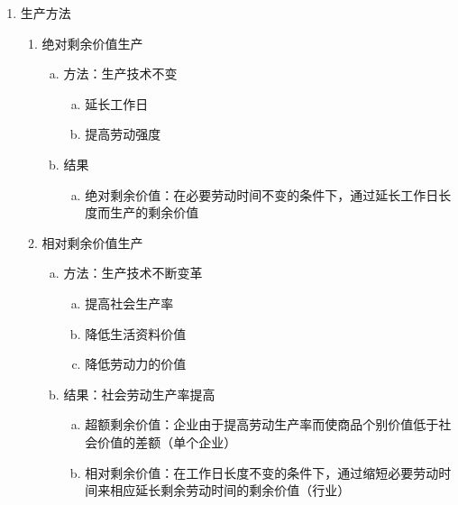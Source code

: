\documentclass[12pt]{book}
\begin{document}
\begin{enumerate}[1.]
    \item 生产方法
          \begin{enumerate}[(1)]
              \item 绝对剩余价值生产
                    \begin{enumerate}[a.]
                        \item 方法：生产技术不变
                              \begin{enumerate}[(a)]
                                  \item 延长工作日
                                  \item 提高劳动强度
                              \end{enumerate}
                        \item 结果
                              \begin{enumerate}[(a)]
                                  \item 绝对剩余价值：在必要劳动时间不变的条件下，通过延长工作日长度而生产的剩余价值
                              \end{enumerate}
                    \end{enumerate}
              \item 相对剩余价值生产
                    \begin{enumerate}[a.]
                        \item 方法：生产技术不断变革
                              \begin{enumerate}[(a)]
                                  \item 提高社会生产率
                                  \item 降低生活资料价值
                                  \item 降低劳动力的价值
                              \end{enumerate}
                        \item 结果：社会劳动生产率提高
                              \begin{enumerate}[(a)]
                                  \item 超额剩余价值：企业由于提高劳动生产率而使商品个别价值低于社会价值的差额（单个企业）
                                  \item 相对剩余价值：在工作日长度不变的条件下，通过缩短必要劳动时间来相应延长剩余劳动时间的剩余价值（行业）
                              \end{enumerate}
                    \end{enumerate}
          \end{enumerate}
\end{enumerate}
\end{document}
